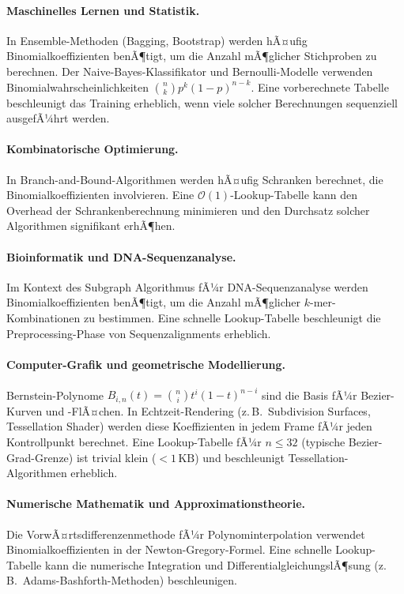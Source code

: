 ﻿\documentclass[12pt, a4paper]{article}
\newcommand{\Oh}{\mathcal{O}}
\theoremstyle{plain}
\theoremstyle{definition}
\theoremstyle{remark}
\renewcommand{\Oh}{\mathcal{O}}
\begin{document}
\paragraph{Maschinelles Lernen und Statistik.}
In Ensemble-Methoden (Bagging, Bootstrap) werden hÃ¤ufig
Binomialkoeffizienten benÃ¶tigt, um die Anzahl mÃ¶glicher Stichproben
zu berechnen. Der Naive-Bayes-Klassifikator und Bernoulli-Modelle
verwenden Binomialwahrscheinlichkeiten $\binom{n}{k} p^k (1-p)^{n-k}$.
Eine vorberechnete Tabelle beschleunigt das Training erheblich,
wenn viele solcher Berechnungen sequenziell ausgefÃ¼hrt werden.

\paragraph{Kombinatorische Optimierung.}
In Branch-and-Bound-Algorithmen werden hÃ¤ufig Schranken berechnet,
die Binomialkoeffizienten involvieren. Eine $\Oh(1)$-Lookup-Tabelle
kann den Overhead der Schrankenberechnung minimieren und den
Durchsatz solcher Algorithmen signifikant erhÃ¶hen.

\paragraph{Bioinformatik und DNA-Sequenzanalyse.}
Im Kontext des Subgraph Algorithmus fÃ¼r DNA-Sequenzanalyse
\cite{epp2026dna} werden Binomialkoeffizienten benÃ¶tigt, um die
Anzahl mÃ¶glicher $k$-mer-Kombinationen zu bestimmen. Eine schnelle
Lookup-Tabelle beschleunigt die Preprocessing-Phase von
Sequenzalignments erheblich.

\paragraph{Computer-Grafik und geometrische Modellierung.}
Bernstein-Polynome $B_{i,n}(t) = \binom{n}{i} t^i (1-t)^{n-i}$
sind die Basis fÃ¼r Bezier-Kurven und -FlÃ¤chen. In Echtzeit-Rendering
(z.\,B.\ Subdivision Surfaces, Tessellation Shader) werden diese
Koeffizienten in jedem Frame fÃ¼r jeden Kontrollpunkt berechnet.
Eine Lookup-Tabelle fÃ¼r $n \le 32$ (typische Bezier-Grad-Grenze)
ist trivial klein ($< 1\,\text{KB}$) und beschleunigt
Tessellation-Algorithmen erheblich.

\paragraph{Numerische Mathematik und Approximationstheorie.}
Die VorwÃ¤rtsdifferenzenmethode fÃ¼r Polynominterpolation verwendet
Binomialkoeffizienten in der Newton-Gregory-Formel. Eine schnelle
Lookup-Tabelle kann die numerische Integration und
DifferentialgleichungslÃ¶sung (z.\,B.\ Adams-Bashforth-Methoden)
beschleunigen.
\end{document}
